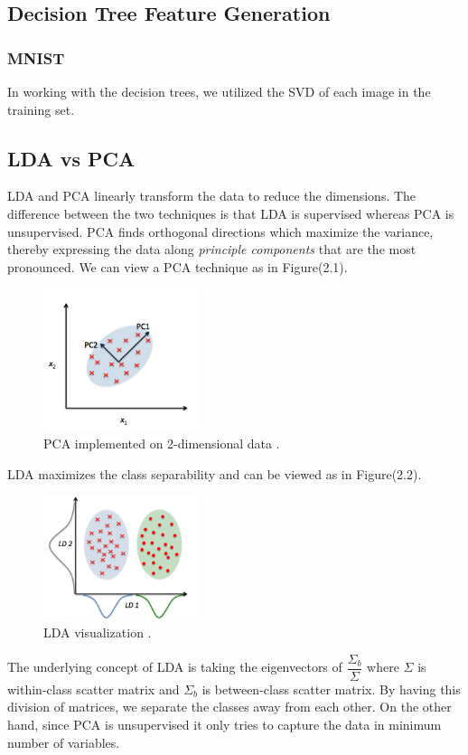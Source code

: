 \subsection{Decision Tree Feature Generation}

\subsubsection{MNIST}

In working with the decision trees, we utilized the SVD of each image in the training set. 


\subsection{LDA vs PCA}

LDA and PCA linearly transform the data to reduce the dimensions. The difference between the two techniques is that LDA is supervised whereas PCA is unsupervised. PCA finds orthogonal directions which maximize the variance, thereby expressing the data along \emph{principle components} that are the most pronounced. We can view a PCA technique as in Figure(2.1). 

	\begin{figure}[H]
		\centering\includegraphics[width=0.4\textwidth]{../images/pca}
		\caption{PCA implemented on 2-dimensional data \cite{images:ldapca}. }
	\end{figure}

LDA maximizes the class separability and can be viewed as in Figure(2.2). 
	\begin{figure}[H]
	\centering\includegraphics[width=0.4\textwidth]{../images/lda}
	\caption{LDA visualization \cite{images:ldapca}. }
	\end{figure}
The underlying concept of LDA is taking the eigenvectors of $ \dfrac{\Sigma_b}{\Sigma}$ where $\Sigma$ is within-class scatter matrix and $\Sigma_b$ is between-class scatter matrix. By having this division of matrices, we separate the classes away from each other. On the other hand, since PCA is unsupervised it only tries to capture the data in minimum number of variables. 
